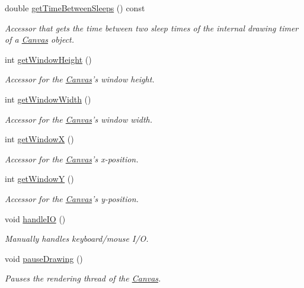 \begin{DoxyCompactItemize}
double \hyperlink{classtsgl_1_1_canvas_a8786d28042b767f5c075361100227af4}{get\-Time\-Between\-Sleeps} () const 
\begin{DoxyCompactList}\small\item\em Accessor that gets the time between two sleep times of the internal drawing timer of a \hyperlink{classtsgl_1_1_canvas}{Canvas} object. \end{DoxyCompactList}\item 
int \hyperlink{classtsgl_1_1_canvas_ad740ebe5d6bd69ab79cde3e84f369f35}{get\-Window\-Height} ()
\begin{DoxyCompactList}\small\item\em Accessor for the \hyperlink{classtsgl_1_1_canvas}{Canvas}'s window height. \end{DoxyCompactList}\item 
int \hyperlink{classtsgl_1_1_canvas_a086a0322f4a6ab27da6929b1aa0593af}{get\-Window\-Width} ()
\begin{DoxyCompactList}\small\item\em Accessor for the \hyperlink{classtsgl_1_1_canvas}{Canvas}'s window width. \end{DoxyCompactList}\item 
int \hyperlink{classtsgl_1_1_canvas_a011ce2354d4565f9d2a323411a47d52d}{get\-Window\-X} ()
\begin{DoxyCompactList}\small\item\em Accessor for the \hyperlink{classtsgl_1_1_canvas}{Canvas}'s x-\/position. \end{DoxyCompactList}\item 
int \hyperlink{classtsgl_1_1_canvas_ad6e98d17d3e43d79628a3bd05221ee8b}{get\-Window\-Y} ()
\begin{DoxyCompactList}\small\item\em Accessor for the \hyperlink{classtsgl_1_1_canvas}{Canvas}'s y-\/position. \end{DoxyCompactList}\item 
void \hyperlink{classtsgl_1_1_canvas_aa499851e5e4b97bb99ca4fb3d633c17e}{handle\-I\-O} ()
\begin{DoxyCompactList}\small\item\em Manually handles keyboard/mouse I/\-O. \end{DoxyCompactList}\item 
void \hyperlink{classtsgl_1_1_canvas_abe021ab5148cc1327523689bced0f35a}{pause\-Drawing} ()
\begin{DoxyCompactList}\small\item\em Pauses the rendering thread of the \hyperlink{classtsgl_1_1_canvas}{Canvas}. \end{DoxyCompactList}\item 

\end{DoxyCompactItemize}
